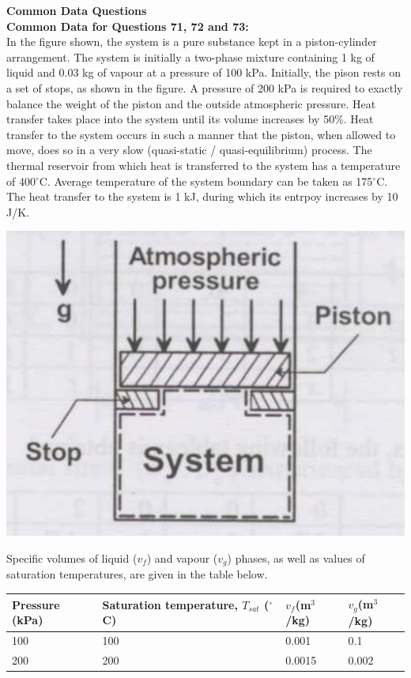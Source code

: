 \documentclass[addpoints,11pt]{exam}
\begin{document}
\begin{questions}
\pagebreak
\large\textbf{Common Data Questions}\\
\normalsize\textbf{Common Data for Questions 71, 72 and 73:}\\

In the figure shown, the system is a pure substance kept in a piston-cylinder arrangement. The system is initially a two-phase mixture containing 1 kg of liquid and 0.03 kg of vapour at a pressure of 100 kPa. Initially, the pison rests on a set of stops, as shown in the figure. A pressure of 200 kPa is required to exactly balance the weight of the piston and the outside atmospheric pressure. Heat transfer takes place into the system until its volume increases by 50\%. Heat transfer to the system occurs in such a manner that the piston, when allowed to move, does so in a very slow (quasi-static / quasi-equilibrium) process. The thermal reservoir from which heat is transferred to the system has a temperature of 400$^\circ$C. Average temperature of the system boundary can be taken as 175$^\circ$C. The heat transfer to the system is 1 kJ, during which its entrpoy increases by 10 J/K.

\begin{center}
    \includegraphics[scale=0.3]{q71}
\end{center}
Specific volumes of liquid ($v_f$) and vapour ($v_g$) phases, as well as values of saturation temperatures, are given in the table below.
\begin{center}
    \begin{tabular}{|l|l|l|l|}
        \hline
        Pressure (kPa)&Saturation temperature, $T_{sat}$ ($^\circ$C)&$v_f$(m$^3$/kg)&$v_g$(m$^3$/kg)\\\hline
        100 & 100 & 0.001 & 0.1\\\hline
        200 & 200 & 0.0015 & 0.002\\\hline
        

\end{tabular}
\end{center}
\end{questions}
\end{document}

